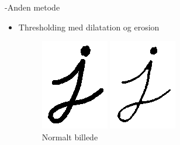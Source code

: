 \begin{frame}[fragile]{\insertsection}{\insertsubsection -Anden metode}
	\begin{itemize}
		\item Thresholding med dilatation og erosion  
		\begin{figure}
			\begin{minipage}{.30\textwidth}
				\includegraphics[width=.7\textwidth]{pictures/i_norm.png}
				\caption{Normalt billede}
			\end{minipage}
			\begin{minipage}{.30\textwidth}
				\includegraphics[width=.7\textwidth]{pictures/i_dilated.png}

\end{minipage}
\end{figure}
\end{itemize}
\end{frame}

